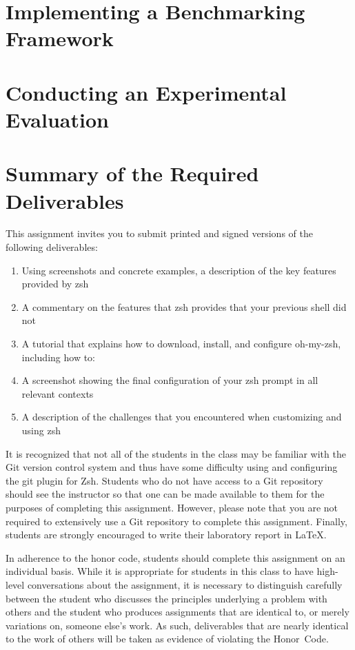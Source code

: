 \section*{Implementing a Benchmarking Framework}



\section*{Conducting an Experimental Evaluation}



\section*{Summary of the Required Deliverables}

This assignment invites you to submit printed and signed versions of the following deliverables:

\begin{enumerate}

    \item Using screenshots and concrete examples, a description of the key features provided by zsh

    \item A commentary on the features that zsh provides that your previous shell did not

    \item A tutorial that explains how to download, install, and configure oh-my-zsh, including how to:

    \item A screenshot showing the final configuration of your zsh prompt in all relevant contexts

    \item A description of the challenges that you encountered when customizing and using zsh

\end{enumerate}

It is recognized that not all of the students in the class may be familiar with the Git version control system and thus have some
difficulty using and configuring the git plugin for Zsh.  Students who do not have access to a Git repository should see the
instructor so that one can be made available to them for the purposes of completing this assignment. However, please note that you
are not required to extensively use a Git repository to complete this assignment. Finally, students are strongly encouraged to
write their laboratory report in \LaTeX.

In adherence to the honor code, students should complete this assignment on an individual basis. While it is appropriate for
students in this class to have high-level conversations about the assignment, it is necessary to distinguish carefully between the
student who discusses the principles underlying a problem with others and the student who produces assignments that are identical
to, or merely variations on, someone else's work.  As such, deliverables that are nearly identical to the work of others will be
taken as evidence of violating the \mbox{Honor Code}.


